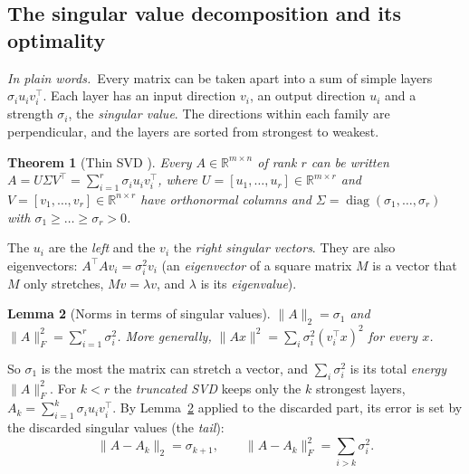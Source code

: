 \documentclass[10pt]{article}
\theoremstyle{plain}
\newtheorem{theorem}{Theorem}[section]
\newtheorem{lemma}[theorem]{Lemma}
\theoremstyle{definition}
\theoremstyle{remark}
\newcommand{\R}{\mathbb{R}}
\newcommand{\T}{^{\top}}
\newcommand{\opn}[1]{\lVert #1\rVert_2}
\newcommand{\fro}[1]{\lVert #1\rVert_F}
\newcommand{\norm}[1]{\lVert #1\rVert}
\newcommand{\plain}{\noindent\emph{In plain words.}\ }
\begin{document}
\subsection{The singular value decomposition and its optimality}
\label{sec:svd}

\plain Every matrix can be taken apart into a sum of simple layers $\sigma_iu_iv_i\T$. Each layer has an input direction $v_i$, an output direction $u_i$ and a strength $\sigma_i$, the \emph{singular value}. The directions within each family are perpendicular, and the layers are sorted from strongest to weakest.

\begin{theorem}[Thin SVD \cite{golubvanloan2013}]\label{thm:svd}
Every $A\in\R^{m\times n}$ of rank $r$ can be written $A=U\Sigma V\T=\sum_{i=1}^r\sigma_i u_iv_i\T$, where $U=[u_1,\dots,u_r]\in\R^{m\times r}$ and $V=[v_1,\dots,v_r]\in\R^{n\times r}$ have orthonormal columns and $\Sigma=\operatorname{diag}(\sigma_1,\dots,\sigma_r)$ with $\sigma_1\ge\dots\ge\sigma_r>0$.
\end{theorem}

The $u_i$ are the \emph{left} and the $v_i$ the \emph{right singular vectors}. They are also eigenvectors: $A\T Av_i=\sigma_i^2v_i$ (an \emph{eigenvector} of a square matrix $M$ is a vector that $M$ only stretches, $Mv=\lambda v$, and $\lambda$ is its \emph{eigenvalue}).

\begin{lemma}[Norms in terms of singular values]\label{lem:norms}
$\opn{A}=\sigma_1$ and $\fro{A}^2=\sum_{i=1}^r\sigma_i^2$. More generally, $\norm{Ax}^2=\sum_i\sigma_i^2(v_i\T x)^2$ for every $x$.
\end{lemma}

So $\sigma_1$ is the most the matrix can stretch a vector, and $\sum_i\sigma_i^2$ is its total \emph{energy} $\fro A^2$. For $k<r$ the \emph{truncated SVD} keeps only the $k$ strongest layers, $A_k=\sum_{i=1}^k\sigma_iu_iv_i\T$. By Lemma~\ref{lem:norms} applied to the discarded part, its error is set by the discarded singular values (the \emph{tail}):
\begin{equation}\label{eq:tail}
\opn{A-A_k}=\sigma_{k+1},\qquad \fro{A-A_k}^2=\sum_{i>k}\sigma_i^2 .
\end{equation}
\end{document}
